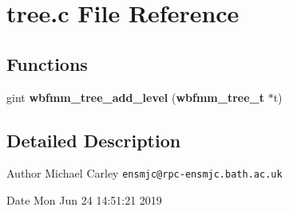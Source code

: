 \section{tree.\+c File Reference}
\label{tree_8c}
\subsection*{Functions}
\begin{DoxyCompactItemize}
\item 
gint {\bf wbfmm\+\_\+tree\+\_\+add\+\_\+level} ({\bf wbfmm\+\_\+tree\+\_\+t} $\ast$t)
\end{DoxyCompactItemize}


\subsection{Detailed Description}
\begin{DoxyAuthor}{Author}
Michael Carley {\tt ensmjc@rpc-\/ensmjc.\+bath.\+ac.\+uk} 
\end{DoxyAuthor}
\begin{DoxyDate}{Date}
Mon Jun 24 14\+:51\+:21 2019 
\end{DoxyDate}
